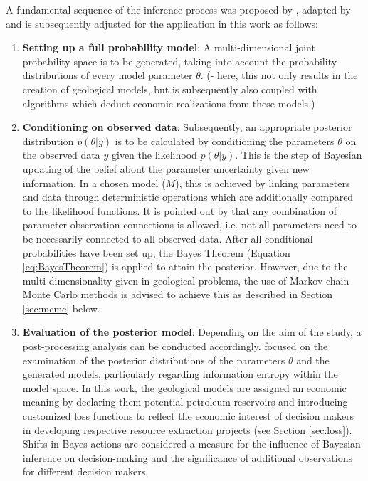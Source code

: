         A fundamental sequence of the inference process was proposed by \citet{gelman2014bayesian}, adapted by \citet{delaVarga2016} and is subsequently adjusted for the application in this work as follows:
        \begin{enumerate}
        	\item \textbf{Setting up a full probability model}: A multi-dimensional joint probability space is to be generated, taking into account the probability distributions of every model parameter $\theta$. (- here, this not only results in the creation of geological models, but is subsequently also coupled with algorithms which deduct economic realizations from these models.)
        	\item \textbf{Conditioning on observed data}: Subsequently, an appropriate posterior distribution $p(\theta|y)$ is to be calculated by conditioning the parameters $\theta$ on the observed data $y$ given the likelihood $p(\theta|y)$. This is the step of Bayesian updating of the belief about the parameter uncertainty given new information.
        	In a chosen model ($M$), this is achieved by linking parameters and data through deterministic operations which are additionally compared to the likelihood functions. It is pointed out by \citet{delaVarga2016} that any combination of parameter-observation connections is allowed, i.e. not all parameters need to be necessarily connected to all observed data. After all conditional probabilities have been set up, the Bayes Theorem (Equation \ref{eq:BayesTheorem}) is applied to attain the posterior. However, due to the multi-dimensionality given in geological problems, the use of Markov chain Monte Carlo methods is advised to achieve this as described in Section \ref{sec:mcmc} below.
        	\item \textbf{Evaluation of the posterior model}: Depending on the aim of the study, a post-processing analysis can be conducted accordingly. \citet{delaVarga2016} focused on the examination of the posterior distributions of the parameters $\theta$ and the generated models, particularly regarding information entropy within the model space. In this work, the geological models are assigned an economic meaning by declaring them potential petroleum reservoirs and introducing customized loss functions to reflect the economic interest of decision makers in developing respective resource extraction projects (see Section \ref{sec:loss}). Shifts in Bayes actions are considered a measure for the influence of Bayesian inference on decision-making and the significance of additional observations for different decision makers.
        \end{enumerate}
        
